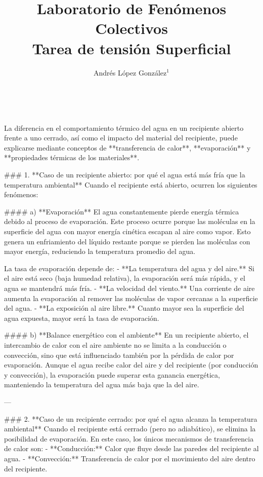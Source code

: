 \documentclass[article,12pt]{elsarticle}
\begin{document}
\begin{frontmatter}
    \title{Laboratorio de Fenómenos Colectivos \\  Tarea de tensión Superficial} \\
    \author{Andrés López González$^1$} %
    \address{$^1$ Facultad de Ciencias, Universidad Nacional Autónoma de México, M\'exico CDMX.}
\end{frontmatter}

La diferencia en el comportamiento térmico del agua en un recipiente abierto frente a uno cerrado, así como el impacto del material del recipiente, puede explicarse mediante conceptos de **transferencia de calor**, **evaporación** y **propiedades térmicas de los materiales**. 

### 1. **Caso de un recipiente abierto: por qué el agua está más fría que la temperatura ambiental**
Cuando el recipiente está abierto, ocurren los siguientes fenómenos:

#### a) **Evaporación**
El agua constantemente pierde energía térmica debido al proceso de evaporación. Este proceso ocurre porque las moléculas en la superficie del agua con mayor energía cinética escapan al aire como vapor. Esto genera un enfriamiento del líquido restante porque se pierden las moléculas con mayor energía, reduciendo la temperatura promedio del agua.

La tasa de evaporación depende de:
- **La temperatura del agua y del aire.** Si el aire está seco (baja humedad relativa), la evaporación será más rápida, y el agua se mantendrá más fría.
- **La velocidad del viento.** Una corriente de aire aumenta la evaporación al remover las moléculas de vapor cercanas a la superficie del agua.
- **La exposición al aire libre.** Cuanto mayor sea la superficie del agua expuesta, mayor será la tasa de evaporación.

#### b) **Balance energético con el ambiente**
En un recipiente abierto, el intercambio de calor con el aire ambiente no se limita a la conducción o convección, sino que está influenciado también por la pérdida de calor por evaporación. Aunque el agua recibe calor del aire y del recipiente (por conducción y convección), la evaporación puede superar esta ganancia energética, manteniendo la temperatura del agua más baja que la del aire.

---

### 2. **Caso de un recipiente cerrado: por qué el agua alcanza la temperatura ambiental**
Cuando el recipiente está cerrado (pero no adiabático), se elimina la posibilidad de evaporación. En este caso, los únicos mecanismos de transferencia de calor son:
- **Conducción:** Calor que fluye desde las paredes del recipiente al agua.
- **Convección:** Transferencia de calor por el movimiento del aire dentro del recipiente.
  
\end{document}
